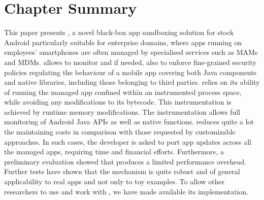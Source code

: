 \section{Chapter Summary}

This paper presents \asd, a novel black-box app sandboxing solution for stock Android particularly suitable for enterprise domains, where apps running on employees' smartphones are often managed by specialised services such as MAMs and MDMs.  
\asd allows to monitor and if needed, also to enforce fine-grained security policies regulating the behaviour of a mobile app covering both Java components and native libraries, including those belonging to third parties.  \asd relies on its ability of running the managed app confined within an instrumented process space, while avoiding any modifications to its bytecode. This instrumentation is achieved  by runtime memory modifications. The instrumentation  allows full monitoring of Android Java APIs as well as native functions.  \asd reduces quite a lot the maintaining costs in comparison with those requested by customizable approaches. In such cases, the developer is asked to port app updates across all the managed apps, requiring time and financial efforts. Furthermore, a preliminary evaluation showed that \asd produces a limited performance overhead. Further tests have shown that the mechanism is quite robust and of general applicability to real apps and not only to toy examples. To allow other researchers to use and work with \asd, we have made available its implementation.